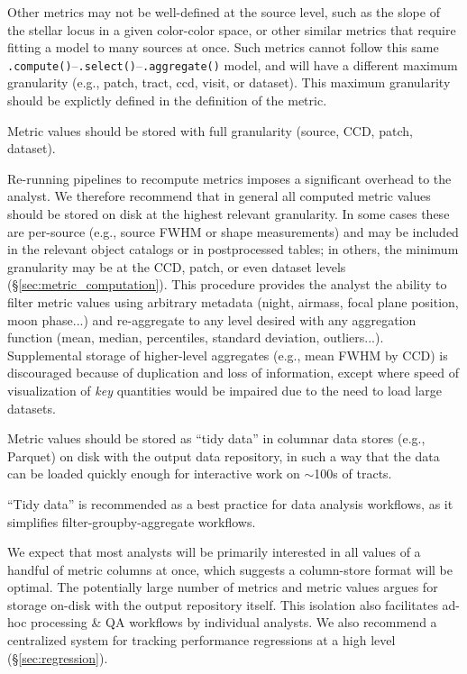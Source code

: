 Other metrics may not be well-defined at the source level, such as the slope of the stellar locus in a given color-color space, or other similar metrics that require fitting a model to many sources at once.
Such metrics cannot follow this same \texttt{.compute()}--\texttt{.select()}--\texttt{.aggregate()} model, and will have a different maximum granularity (e.g., patch, tract, ccd, visit, or dataset).
This maximum granularity should be explictly defined in the definition of the metric.

\begin{recommendation}
Metric values should be stored with full granularity (source, CCD, patch, dataset).
\end{recommendation}

Re-running pipelines to recompute metrics imposes a significant overhead to the analyst.
We therefore recommend that in general all computed metric values should be stored on disk at the highest relevant granularity.
In some cases these are per-source (e.g., source FWHM or shape measurements) and may be included in the relevant object catalogs or in postprocessed tables; in others, the minimum granularity may be at the CCD, patch, or even dataset levels (\S \ref{sec:metric_computation}).
This procedure provides the analyst the ability to filter metric values using arbitrary metadata (night, airmass, focal plane position, moon phase...) and re-aggregate to any level desired with any aggregation function (mean, median, percentiles, standard deviation, outliers...).
Supplemental storage of higher-level aggregates (e.g., mean FWHM by CCD) is discouraged because of duplication and loss of information, except where speed of visualization of \emph{key} quantities would be impaired due to the need to load large datasets.


\begin{recommendation}
Metric values should be stored as ``tidy data'' in columnar data stores (e.g., Parquet) on disk with the output data repository, in such a way that the data can be loaded quickly enough for interactive work on $\sim$100s of tracts.
\end{recommendation}

``Tidy data'' \citep{JSSv059i10} is recommended as a best practice for data analysis workflows, as it simplifies filter-groupby-aggregate workflows.

We expect that most analysts will be primarily interested in all values of a handful of metric columns at once, which suggests a column-store format will be optimal.
The potentially large number of metrics and metric values argues for storage on-disk with the output repository itself.
This isolation also facilitates ad-hoc processing \& QA workflows by individual analysts.
We also recommend a centralized system for tracking performance regressions at a high level (\S \ref{sec:regression}).

